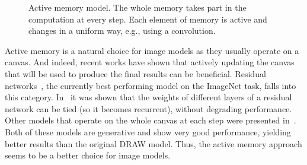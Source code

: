 \documentclass{article}
\begin{document}
\begin{figure}[hb]
\begin{center}
\end{center}
\caption{Active memory model. The whole memory takes part in the computation at every
  step. Each element of memory is active and changes in a uniform way,
  e.g., using a convolution.}
\label{fig:act_mem}
\end{figure}

Active memory is a natural choice for image models as they
usually operate on a canvas. And indeed, recent works have shown
that actively updating the canvas that will be used to produce
the final results can be beneficial. Residual networks~\cite{resnet},
the currently best performing model on the ImageNet task,
falls into this category. In~\cite{poggio16} it was shown that
the weights of different layers of a residual network can be tied
(so it becomes recurrent), without degrading performance.
Other models that operate on the whole canvas at each step
were presented in~\cite{one_shot, conceptual_compression}.
Both of these models are generative and show very good performance,
yielding better results than the original DRAW model.
Thus, the active memory approach seems to be a better choice for image models.
\end{document}
